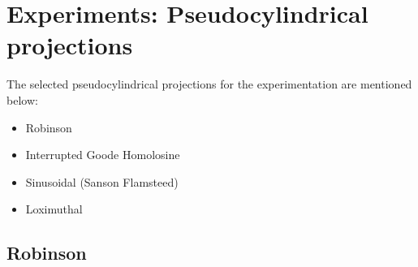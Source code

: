 \newpage

\section{Experiments: Pseudocylindrical projections}
The selected pseudocylindrical projections for the experimentation are mentioned below:
\begin{itemize}
    \item Robinson
    \item Interrupted Goode Homolosine
    \item Sinusoidal (Sanson Flamsteed)
    \item Loximuthal
\end{itemize}
\subsection{Robinson}
